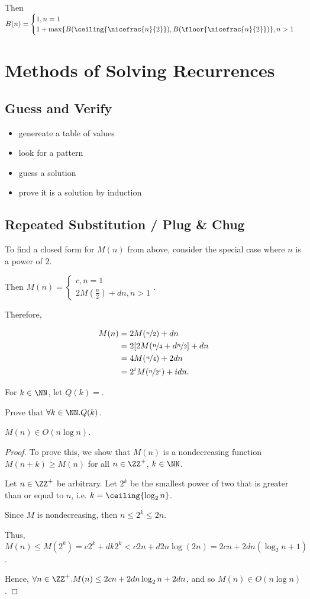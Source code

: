 \documentclass[11pt]{scrartcl}
\begin{document}
Then $B(n) = \begin{cases}
  1, n = 1\\
  1+\max\{B(\ceiling{\nicefrac{n}{2}}), B(\floor{\nicefrac{n}{2}})\}, n > 1
\end{cases}$
\section{Methods of Solving Recurrences}

\subsection{Guess and Verify}
\begin{itemize}
\item genereate a table of values
\item look for a pattern
\item guess a solution
\item prove it is a solution by induction
\end{itemize}
\subsection{Repeated Substitution / Plug \& Chug}
To find a closed form for $M(n)$ from above, consider the special case where $n$ is a power of $2$.

Then $M(n) = \begin{cases}
  c, n=1\\
  2M(\frac{n}{2})+dn, n>1
\end{cases}$.

Therefore,

\begin{align}
  M(n)&= 2M(\nicefrac{n}{2}) + dn\\
      &=2[2M(\nicefrac{n}{4}+d \nicefrac{n}{2}] + dn\\
      &= 4M(\nicefrac{n}{4})+ 2 dn\\
      &= 2^iM(\nicefrac{n}{2^{i}})+ i dn.
\end{align}

For $k\in\NN$, let $Q(k) =$.

Prove that $\forall k\in\NN.Q(k)$.

\begin{theorem}
  $M(n) \in O(n\log n)$.
\end{theorem}
\begin{proof}
  \hfill

  To prove this, we show that $M(n)$ is a nondecreasing function
  $M(n+k)\geq M(n)$ for all $n\in \ZZ^+$, $k\in \NN$.

  Let $n\in\ZZ^{+}$ be arbitrary. Let $2^k$ be the smallest power of
  two that is greater than or equal to $n$, i.e.
  $k = \ceiling{\log_2 n}$.

  Since $M$ is nondecreasing, then $n \leq 2^k \leq 2n$.

  Thus, $M(n) \leq M(2^k) = c2^k+dk2^k < c2n + d2n\log(2n) = 2cn + 2dn(\log_2n+1)$.

  Hence, $\forall n\in\ZZ^+.M(n) \leq 2cn+2dn\log_2n+2dn$, and so $M(n)\in O(n\log n)$.
\end{proof}
\end{document}
